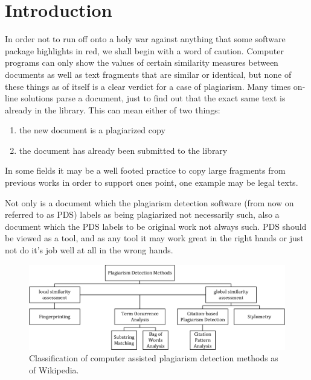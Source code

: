 \section{Introduction}
In order not to run off onto a holy war against anything that some software package highlights in red, we shall begin with a word of caution. Computer programs can only show the values of certain similarity measures between documents as well as text fragments that are similar or identical, but none of these things as of itself is a clear verdict for a case of plagiarism. Many times on-line solutions parse a document, just to find out that the exact same text is already in the library. This can mean either of two things: 
\begin{enumerate}
\item the new document is a plagiarized copy
\item the document has already been submitted to the library
\end{enumerate}

In some fields it may be a well footed practice to copy large fragments from previous works in order to support ones point, one example may be legal texts.

Not only is a document which the plagiarism detection software (from now on referred to as PDS) labels as being plagiarized not necessarily such, also a document which the PDS labels to be original work not always such. PDS should be viewed as a tool, and as any tool it may work great in the right hands or just not do it's job well at all in the wrong hands.


\begin{figure}
\includegraphics{figure/PDS_Classification}
\caption{Classification of computer assisted plagiarism detection methods as of Wikipedia. \cite{PDS_Classification}}
\end{figure}
